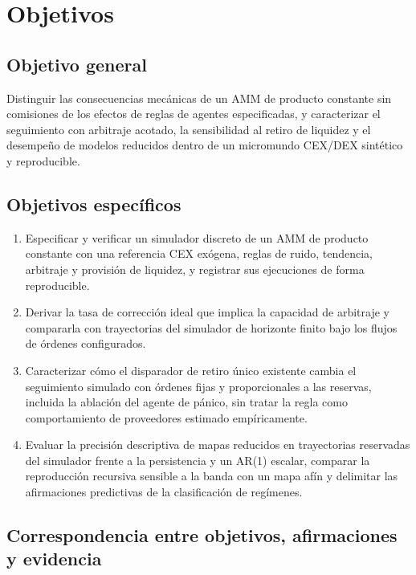 \chapter{Objetivos}
\label{cap:objetivos}

\section{Objetivo general}

Distinguir las consecuencias mecánicas de un AMM de producto constante sin comisiones de los efectos de reglas de agentes especificadas, y caracterizar el seguimiento con arbitraje acotado, la sensibilidad al retiro de liquidez y el desempeño de modelos reducidos dentro de un micromundo CEX/DEX sintético y reproducible.

\section{Objetivos específicos}

\begin{enumerate}[label=\textbf{OE\arabic*.}, leftmargin=3em]
  \item Especificar y verificar un simulador discreto de un AMM de producto constante con una referencia CEX exógena, reglas de ruido, tendencia, arbitraje y provisión de liquidez, y registrar sus ejecuciones de forma reproducible.
  \item Derivar la tasa de corrección ideal que implica la capacidad de arbitraje y compararla con trayectorias del simulador de horizonte finito bajo los flujos de órdenes configurados.
  \item Caracterizar cómo el disparador de retiro único existente cambia el seguimiento simulado con órdenes fijas y proporcionales a las reservas, incluida la ablación del agente de pánico, sin tratar la regla como comportamiento de proveedores estimado empíricamente.
  \item Evaluar la precisión descriptiva de mapas reducidos en trayectorias reservadas del simulador frente a la persistencia y un AR(1) escalar, comparar la reproducción recursiva sensible a la banda con un mapa afín y delimitar las afirmaciones predictivas de la clasificación de regímenes.
\end{enumerate}

\section{Correspondencia entre objetivos, afirmaciones y evidencia}


